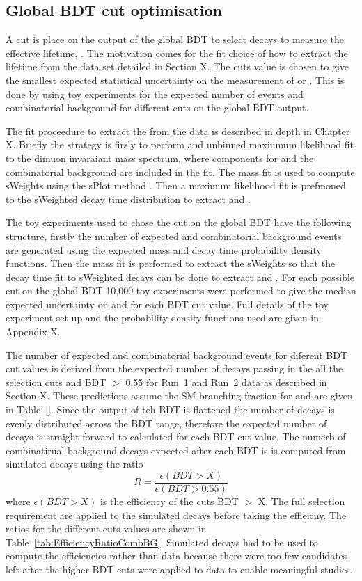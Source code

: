 \subsection{Global BDT cut optimisation}
\label{sec:globalBDToptimisation}
 A cut is place on the output of the global BDT to select \bsmumu decays to measure the \bsmumu effective lifetime, \tmumu. The motivation comes for the fit choice of how to extract the lifetime from the data set detailed in Section X. The cuts value is chosen to give the smallest expected statistical uncertainty on the measurement of \tmumu or \invtmumu. This is done by using toy experiments for the expected number of \bsmumu events and combinatorial background for different cuts on the global BDT output. 

The fit proceedure to extract the \tmumu from the data is described in depth in Chapter X. Briefly the strategy is firsly to perform and unbinned maxiumum likelihood fit to the dimuon invaraiant mass spectrum, where components for \bsmumu and the combinatorial background are included in the fit. The mass fit is used to compute sWeights using the sPlot method \cite{}. Then a maximum likelihood fit is prefmoned to the sWeighted decay time distribution to extract \tmumu and \invtmumu. 

The toy experiments used to chose the cut on the global BDT have the following structure, firstly the number of expected \bsmumu and combinatorial background events are generated using the expected mass and decay time probability density functions. Then the mass fit is performed to extract the sWeights so that the decay time fit to sWeighted decays can be done to extract \tmumu and \invtmumu. For each possible cut on the global BDT 10,000 toy experiments were performed to give the median expected uncertainty on \tmumu and \invtmumu for each BDT cut value. Full details of the toy experiment set up and the probability density functions used are given in Appendix X. 

The number of expected \bsmumu and combinatorial background events for diferent BDT cut values is derived from the expected number of decays passing in the all the selection cuts and BDT $>$ 0.55 for Run~1 and Run~2 data as described in Section X. These predictions assume the SM branching fraction for \bsmumu and are given in Table~\ref{}. Since the output of teh BDT is flattened the number of \bsmumu decays is evenly distributed across the BDT range, therefore the expected number of \bsmumu decays is straight forward to calculated for each BDT cut value. The numerb of combinatirual background decays expected after each BDT is is computed from simulated \bbbarmumux decays using the ratio
\begin{equation}
R = \frac{\epsilon(BDT > X)}{\epsilon(BDT > 0.55)}
\end{equation}
where $\epsilon(BDT > X)$ is the efficiency of the cuts BDT $>$ X. The full selection requirement are applied to the simulated decays before taking the effieicny. The ratios for the different cuts values are shown in Table~\ref{tab:EfficiencyRatioCombBG}. Simulated decays had to be used to compute the efficiencies rather than data because there were too few candidates left after the higher BDT cuts were applied to data to enable meaningful studies. 


